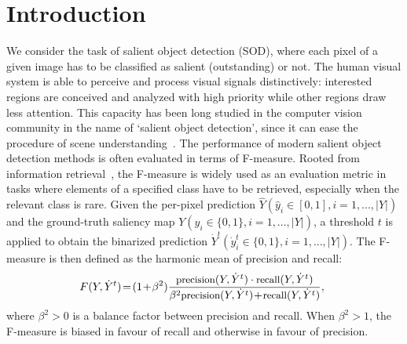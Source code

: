 \documentclass[10pt,twocolumn,letterpaper]{article}
\begin{document}
\section{Introduction}
We consider the task of salient object detection (SOD), where each pixel of a
given image has to be classified as salient (outstanding) or not.
%
The human visual system is able to perceive and process visual signals
distinctively: interested regions are conceived and analyzed with high priority
while other regions draw less attention.
%
This capacity has been long studied in the computer vision community
in the name of `salient object detection',
since it can ease the procedure of scene understanding~\cite{borji2015salient}.
%
The performance of modern salient object detection methods is often evaluated 
in terms of F-measure.
%
Rooted from information retrieval~\cite{van1974foundation},
the F-measure is widely used as an evaluation metric
in tasks where elements of a specified class have to be retrieved,
especially when the relevant class is rare.
%
Given the per-pixel prediction $\hat{Y} (\hat{y}_i \!\in\! [0, 1], i\!=\!1,...,|Y|)$
and the ground-truth saliency map $Y (y_i \!\in\! \{0, 1\}, i\!=\!1,...,|Y|)$,
a threshold $t$ is applied to obtain the binarized prediction
$\dot{Y}^t (\dot{y}^t_i \!\in\! \{0, 1\}, i\!=\!1,...,|Y|)$.
%
The F-measure is then defined as the harmonic mean of precision and recall:
\begin{equation}\small
\!\!F(Y, \dot{Y}^t) \!=\!
(1\!+\!\beta^2)\frac{\text{precision}(Y, \dot{Y}^t) \cdot \text{recall}(Y, \dot{Y}^t)}
{\beta^2 \text{precision}(Y, \dot{Y}^t) \!+\! \text{recall}(Y, \dot{Y}^t)},
\label{eq:def-f}
\end{equation}
where $\beta^2\!>\!0$ is a balance factor between precision and recall.
%
When $\beta^2\!>\!1$, the F-measure is biased in favour of recall
and otherwise in favour of precision.
\end{document}
